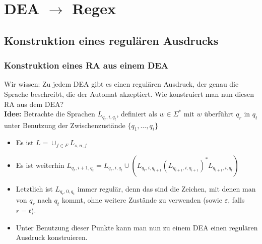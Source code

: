 

\section{DEA $\rightarrow$ Regex}
\subsection{Konstruktion eines regulären Ausdrucks}
\begin{frame}
\frametitle{Konstruktion eines RA aus einem DEA}
Wir wissen: Zu jedem DEA gibt es einen regulären Ausdruck, der genau die Sprache beschreibt, die der Automat akzeptiert. Wie konstruiert man nun diesen RA aus dem DEA?\\[0.6cm]
\textbf{Idee:} Betrachte die Sprachen $L_{q_r,i,q_t}$, definiert als \( w \in \Sigma^*\) mit $w$ überführt $q_r$ in $q_t$ unter Benutzung der Zwischenzustände $\{q_1,\ldots,q_i\}$
\begin{itemize}
\item Es ist $L = \cup_{f\in F} L_{s,n,f}$
\item Es ist weiterhin $L_{q_r,i+1,q_t} = L_{q_r,i,q_t} \cup (L_{q_r,i,q_{i+1}}(L_{q_{i+1},i,q_{i+1}})^*L_{q_{i+1},i,q_t})$
\item Letztlich ist $L_{q_r, 0, q_t}$ immer regulär, denn das sind die Zeichen, mit denen man von $q_r$ nach $q_t$ kommt, ohne weitere Zustände zu verwenden (sowie $\varepsilon$, falls $r = t$).
\item Unter Benutzung dieser Punkte kann man nun zu einem DEA einen regulären Ausdruck konstruieren.
\end{itemize}
\end{frame}


